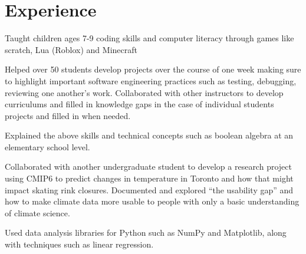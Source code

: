 \documentclass[letterpaper,10pt]{article}
\begin{document}
    \section{Experience}
    \begin{resume_list}
        \item Taught children ages 7-9 coding skills and computer literacy through games like scratch, Lua (Roblox) and Minecraft
        \item Helped over 50 students develop projects over the course of one week making sure to highlight important software engineering practices
        such as testing, debugging, reviewing one another's work. Collaborated with other instructors to develop curriculums and filled in knowledge gaps in the case of individual students projects and filled in when needed.
        \item Explained the above skills and technical concepts such as boolean algebra at an elementary school level.
    \end{resume_list}

    \begin{resume_list}
        \item Collaborated with another undergraduate student to develop a research project using CMIP6 to predict changes in temperature in Toronto and how that might impact
        skating rink closures. Documented and explored ``the usability gap'' and how to make climate data more usable to people with only a basic understanding of climate science.
        \item Used data analysis libraries for Python such as NumPy and Matplotlib, along with techniques such as linear regression.
    \end{resume_list}
\end{document}
